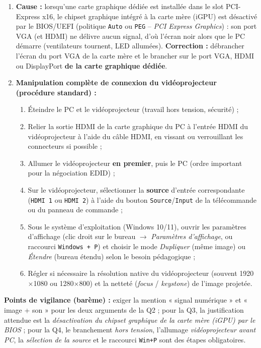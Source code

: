 \documentclass[11pt]{article}
\begin{document}
\begin{corrige}
\begin{enumerate}
\begin{itemize}
  \end{itemize}
  \item \textbf{Cause :} lorsqu'une carte graphique dédiée est installée dans le slot PCI-Express x16, le chipset graphique intégré à la carte mère (iGPU) est désactivé par le BIOS/UEFI (politique \texttt{Auto} ou \texttt{PEG} -- \emph{PCI Express Graphics}) : son port VGA (et HDMI) ne délivre aucun signal, d'où l'écran noir alors que le PC démarre (ventilateurs tournent, LED allumées). \textbf{Correction :} débrancher l'écran du port VGA de la carte mère et le brancher sur le port VGA, HDMI ou DisplayPort \textbf{de la carte graphique dédiée}.
  \item \textbf{Manipulation complète de connexion du vidéoprojecteur (procédure standard) :}
  \begin{enumerate}
    \item Éteindre le PC et le vidéoprojecteur (travail hors tension, sécurité) ;
    \item Relier la sortie HDMI de la carte graphique du PC à l'entrée HDMI du vidéoprojecteur à l'aide du câble HDMI, en vissant ou verrouillant les connecteurs si possible ;
    \item Allumer le vidéoprojecteur \textbf{en premier}, puis le PC (ordre important pour la négociation EDID) ;
    \item Sur le vidéoprojecteur, sélectionner la \textbf{source} d'entrée correspondante (\texttt{HDMI 1} ou \texttt{HDMI 2}) à l'aide du bouton \texttt{Source}/\texttt{Input} de la télécommande ou du panneau de commande ;
    \item Sous le système d'exploitation (Windows 10/11), ouvrir les paramètres d'affichage (clic droit sur le bureau $\rightarrow$ \emph{Paramètres d'affichage}, ou raccourci \texttt{Windows + P}) et choisir le mode \emph{Dupliquer} (même image) ou \emph{Étendre} (bureau étendu) selon le besoin pédagogique ;
    \item Régler si nécessaire la résolution native du vidéoprojecteur (souvent 1920$\times$1080 ou 1280$\times$800) et la netteté (\emph{focus} / \emph{keystone}) de l'image projetée.
  \end{enumerate}
\end{enumerate}
\textbf{Points de vigilance (barème) :} exiger la mention « signal numérique » et « image + son » pour les deux arguments de la Q2 ; pour la Q3, la justification attendue est la \emph{désactivation du chipset graphique de la carte mère (iGPU) par le BIOS} ; pour la Q4, le branchement \emph{hors tension}, l'allumage \emph{vidéoprojecteur avant PC}, la \emph{sélection de la source} et le raccourci \texttt{Win+P} sont des étapes obligatoires.
\end{corrige}
\end{document}
